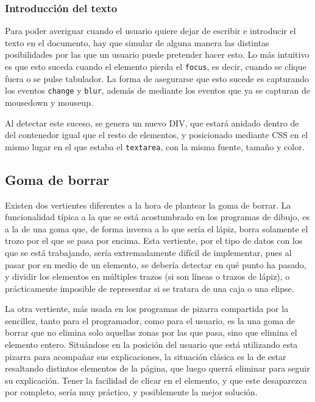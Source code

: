 
\subsubsection{Introducción del texto} %
\label{ssub:introduccion_del_texto}
Para poder averiguar cuando el usuario quiere dejar de escribir e introducir el texto en el documento, hay que simular de alguna manera las distintas posibilidades por las que un usuario puede pretender hacer esto. Lo más intuitivo es que esto suceda cuando el elemento pierda el \texttt{focus}, es decir, cuando se clique fuera o se pulse tabulador. La forma de asegurarse que esto sucede es capturando los eventos \texttt{change} y \texttt{blur}, además de mediante los eventos que ya se capturan de mousedown y mouseup.

Al detectar este suceso, se genera un nuevo DIV, que estará anidado dentro de del contenedor igual que el resto de elementos, y posicionado mediante CSS en el mismo lugar en el que estaba el \texttt{textarea}, con la misma fuente, tamaño y color.




\subsection{Goma de borrar} %
\label{sub:goma_de_borrar}

Existen dos vertientes diferentes a la hora de plantear la goma de borrar. La funcionalidad típica a la que se está acostumbrado en los programas de dibujo, es a la de una goma que, de forma inversa a lo que sería el lápiz, borra solamente el trozo por el que se pasa por encima. Esta vertiente, por el tipo de datos con los que se está trabajando, sería extremadamente difícil de implementar, pues al pasar por en medio de un elemento, se debería detectar en qué punto ha pasado, y dividir los elementos en múltiples trazos (si son líneas o trazos de lápiz), o prácticamente imposible de representar si se tratara de una caja o una elipse.

La otra vertiente, más usada en los programas de pizarra compartida por la sencillez, tanto para el programador, como para el usuario, es la una goma de borrar que no elimina solo aquellas zonas por las que pasa, sino que elimina el elemento entero. Situándose en la posición del usuario que está utilizando esta pizarra para acompañar sus explicaciones, la situación clásica es la de estar resaltando distintos elementos de la página, que luego querrá eliminar para seguir su explicación. Tener la facilidad de clicar en el elemento, y que este desaparezca por completo, sería muy práctico, y posiblemente la mejor solución.

